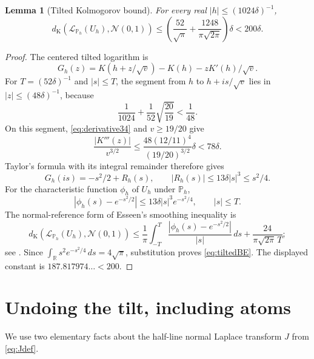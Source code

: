 \documentclass[11pt]{article}
\numberwithin{equation}{section}
\newtheorem{lemma}[theorem]{Lemma}
\theoremstyle{remark}
\newcommand{\Pp}{\mathbb P}
\newcommand{\R}{\mathbb R}
\newcommand{\dK}{d_{\mathrm K}}
\newcommand{\Normal}{\mathcal N(0,1)}
\begin{document}
\begin{lemma}[Tilted Kolmogorov bound]\label{lem:tiltedCLT}
For every real $|h|\le(1024\delta)^{-1}$,
\begin{equation}\label{eq:tiltedBE}
 \dK(\mathcal L_{\Pp_h}(U_h),\Normal)
 \le\left(\frac{52}{\sqrt\pi}
       +\frac{1248}{\pi\sqrt{2\pi}}\right)\delta
 <200\delta.
\end{equation}
\end{lemma}
\begin{proof}
The centered tilted logarithm is
\[
 G_h(z)=K(h+z/\sqrt v)-K(h)-zK'(h)/\sqrt v.
\]
For $T=(52\delta)^{-1}$ and $|s|\le T$, the segment from $h$ to
$h+is/\sqrt v$ lies in $|z|\le(48\delta)^{-1}$, because
\[
 \frac1{1024}+\frac1{52}\sqrt{\frac{20}{19}}<\frac1{48}.
\]
On this segment, \eqref{eq:derivative34} and $v\ge19/20$ give
\[
 \frac{|K'''(z)|}{v^{3/2}}
 \le\frac{48(12/11)^4}{(19/20)^{3/2}}\delta<78\delta.
\]
Taylor's formula with its integral remainder therefore gives
\[
 G_h(is)=-s^2/2+R_h(s),\qquad
 |R_h(s)|\le13\delta|s|^3\le s^2/4.
\]
For the characteristic function $\phi_h$ of $U_h$ under $\Pp_h$,
\begin{equation}\label{eq:tiltedCF}
 |\phi_h(s)-e^{-s^2/2}|
 \le13\delta|s|^3e^{-s^2/4},\qquad |s|\le T.
\end{equation}
The normal-reference form of Esseen's smoothing inequality is
\[
 \dK(\mathcal L_{\Pp_h}(U_h),\Normal)
 \le\frac1\pi\int_{-T}^{T}
          \frac{|\phi_h(s)-e^{-s^2/2}|}{|s|}\,ds
       +\frac{24}{\pi\sqrt{2\pi}\,T};
\]
see \cite[equation~(2.16)]{LPRS}. Since
$\int_\R s^2e^{-s^2/4}\,ds=4\sqrt\pi$, substitution proves
\eqref{eq:tiltedBE}. The displayed constant is $187.817974\ldots<200$.
\end{proof}

\section{Undoing the tilt, including atoms}\label{sec:undo}

We use two elementary facts about the half-line normal Laplace transform
$J$ from \eqref{eq:Jdef}.
\end{document}
